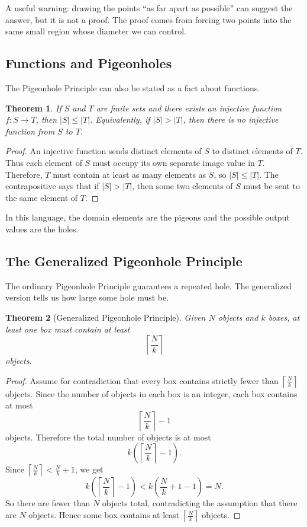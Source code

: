 \documentclass{article}
\newtheorem{theorem}{Theorem}
\begin{document}
A useful warning: drawing the points ``as far apart as possible'' can suggest the answer, but it is not a proof. The proof comes from forcing two points into the same small region whose diameter we can control.

\subsection*{Functions and Pigeonholes}

The Pigeonhole Principle can also be stated as a fact about functions.

\begin{theorem}
If $S$ and $T$ are finite sets and there exists an injective function $f:S\to T$, then $|S|\le |T|$.
Equivalently, if $|S|>|T|$, then there is no injective function from $S$ to $T$.
\end{theorem}

\begin{proof}
An injective function sends distinct elements of $S$ to distinct elements of $T$. Thus each element of $S$ must occupy its own separate image value in $T$. Therefore, $T$ must contain at least as many elements as $S$, so $|S|\le |T|$. The contrapositive says that if $|S|>|T|$, then some two elements of $S$ must be sent to the same element of $T$.
\end{proof}

In this language, the domain elements are the pigeons and the possible output values are the holes.

\subsection*{The Generalized Pigeonhole Principle}

The ordinary Pigeonhole Principle guarantees a repeated hole. The generalized version tells us how large some hole must be.

\begin{theorem}[Generalized Pigeonhole Principle]
Given $N$ objects and $k$ boxes, at least one box must contain at least
\[
    \left\lceil \frac{N}{k}\right\rceil
\]
objects.
\end{theorem}

\begin{proof}
Assume for contradiction that every box contains strictly fewer than $\left\lceil \frac{N}{k}\right\rceil$ objects. Since the number of objects in each box is an integer, each box contains at most
\[
    \left\lceil \frac{N}{k}\right\rceil -1
\]
objects. Therefore the total number of objects is at most
\[
    k\left(\left\lceil \frac{N}{k}\right\rceil -1\right).
\]
Since $\left\lceil \frac{N}{k}\right\rceil < \frac{N}{k}+1$, we get
\[
    k\left(\left\lceil \frac{N}{k}\right\rceil -1\right)
    < k\left(\frac{N}{k}+1-1\right)=N.
\]
So there are fewer than $N$ objects total, contradicting the assumption that there are $N$ objects. Hence some box contains at least $\left\lceil \frac{N}{k}\right\rceil$ objects.
\end{proof}
\end{document}
